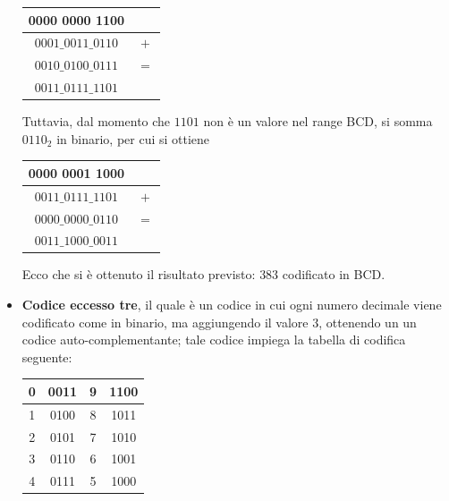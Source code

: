\documentclass[a4paper]{extarticle}
\renewcommand\arraystretch{}
\begin{document}
\begin{itemize}
    \noindent
    \begin{table}[H]
    \setlength{\tabcolsep}{4pt}
    \renewcommand{\arraystretch}{1.2}
    \centering
    \begin{tabular}{cc}
        0000 0000 1100 & \\
        \hline
        $0001\_0011\_0110$ & $+$\\
        \hline
        $0010\_0100\_0111$ & $=$\\
        \hline
        $0011\_0111\_1101$ & \\
    \end{tabular}
    \end{table}

    \noindent
    Tuttavia, dal momento che $1101$ non è un valore nel range BCD, si somma $0110_2$ in binario, per cui si ottiene

    \noindent
    \begin{table}[H]
    \setlength{\tabcolsep}{4pt}
    \renewcommand{\arraystretch}{1.2}
    \centering
    \begin{tabular}{cc}
        0000 0001 1000 & \\
        \hline
        $0011\_0111\_1101$ & $+$\\
        \hline
        $0000\_0000\_0110$ & $=$\\
        \hline
        $0011\_1000\_0011$ & \\
    \end{tabular}
    \end{table}

    \noindent
    Ecco che si è ottenuto il risultato previsto: $383$ codificato in BCD.

    \item \textbf{Codice eccesso tre}, il quale è un codice in cui ogni numero decimale viene codificato come in binario, ma aggiungendo il valore $3$, ottenendo un un codice auto-complementante; tale codice impiega la tabella di codifica seguente:
    
    \noindent
    \begin{table}[H]
    \setlength{\tabcolsep}{4pt}
    \renewcommand{\arraystretch}{1.2}
    \centering
    \begin{tabular}{|c|c|c|c|}
        \hline
        0 & 0011 & 9 & 1100\\
        \hline
        1 & 0100 & 8 & 1011\\
        \hline
        2 & 0101 & 7 & 1010\\
        \hline
        3 & 0110 & 6 & 1001\\
        \hline
        4 & 0111 & 5 & 1000\\
        \hline
    \end{tabular}
    \end{table}


\end{itemize}
\end{document}
